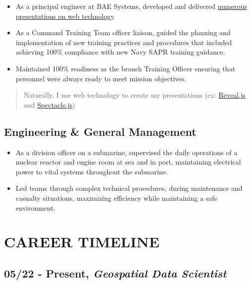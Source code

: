 \documentclass[10pt]{article}
\def\tightlist{}
\begin{document}
\begin{itemize}
\tightlist
\item
  As a principal engineer at BAE Systems, developed and delivered
  \href{https://github.com/jhwohlgemuth?utf8=\%E2\%9C\%93&tab=repositories&q=slides&type=source&language=}{numerous
  presentations on web technology}
\item
  As a Command Training Team officer liaison, guided the planning and
  implementation of new training practices and procedures that included
  achieving 100\% compliance with new Navy SAPR training guidance.
\item
  Maintained 100\% readiness as the branch Training Officer ensuring
  that personnel were always ready to meet mission objectives.
\end{itemize}

\begin{quote}
Naturally, I use web technology to create my presentations (ex:
\href{https://revealjs.com/\#/}{Reveal.js} and
\href{https://formidable.com/open-source/spectacle/}{Spectacle.js})
\end{quote}

\subsection{Engineering \& General
Management}\label{engineering-general-management}

\begin{itemize}
\tightlist
\item
  As a division officer on a submarine, supervised the daily operations
  of a nuclear reactor and engine room at sea and in port, maintaining
  electrical power to vital systems throughout the submarine.
\item
  Led teams through complex technical procedures, during maintenance and
  casualty situations, maximizing efficiency while maintaining a safe
  environment.
\end{itemize}

\section{CAREER TIMELINE}\label{career-timeline}

\subsection{\texorpdfstring{05/22 - Present, \textbf{\emph{Geospatial
Data
Scientist}}}{05/22 - Present, Geospatial Data Scientist}}\label{present-geospatial-data-scientist}
\end{document}
